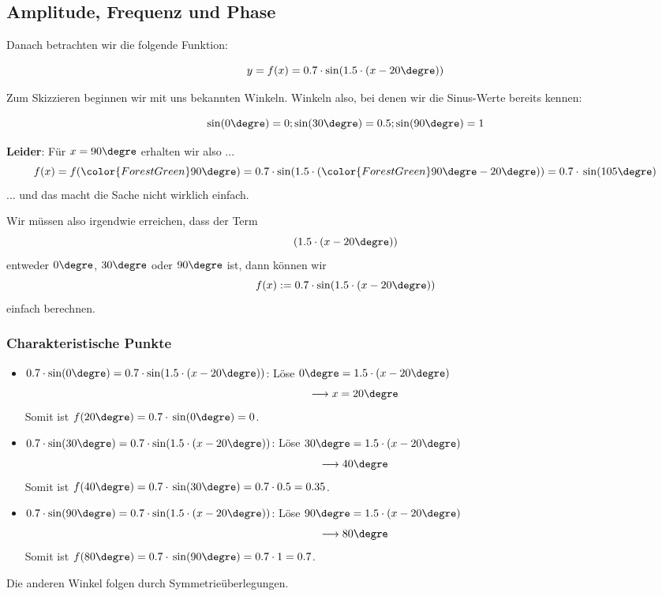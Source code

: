 \subsection{Amplitude, Frequenz und Phase}


Danach betrachten wir die folgende Funktion:

$$y = f(x) = 0.7 \cdot \sin(1.5\cdot(x - 20\degre))$$

\renewcommand{\bbwFunctionColour}{gray!30}\noTRAINER{\trigsysDsin{}}
\renewcommand{\bbwFunctionColour}{blue}

Zum Skizzieren beginnen wir mit uns bekannten Winkeln. Winkeln also, bei denen wir die Sinus-Werte bereits kennen:

$$\sin(0\degre)  = 0  ; \sin(30\degre) = 0.5; \sin(90\degre) = 1  $$

\textbf{Leider}: Für $x=90\degre$ \zB erhalten wir also ... $$f(x) = f({\color{ForestGreen}90\degre}) = 0.7\cdot\sin(1.5\cdot({\color{ForestGreen}90\degre}-20\degre)) = 0.7\cdot{}\sin(105\degre)$$ ... und das macht die Sache nicht wirklich einfach.


Wir müssen also irgendwie erreichen, dass der Term $$(1.5\cdot(x-20\degre))$$
entweder $0\degre$, $30\degre$ oder $90\degre$ ist, dann können
wir $$f(x) := 0.7\cdot\sin(1.5\cdot(x-20\degre))$$ einfach berechnen.


\newpage
\subsubsection{Charakteristische Punkte}

\begin{itemize}
\item  $0.7\cdot\sin(0\degre) = 0.7\cdot\sin(1.5\cdot(x-20\degre))$:
  Löse $0\degre = 1.5\cdot(x-20\degre)$
  $$\longrightarrow x=20\degre$$
  Somit ist $f(20\degre) = 0.7\cdot{}\sin(0\degre) = 0$.
\item  $0.7\cdot\sin(30\degre) = 0.7\cdot\sin(1.5\cdot(x-20\degre))$:
  Löse $30\degre = 1.5\cdot(x-20\degre)$
  $$\longrightarrow 40\degre$$
  Somit ist $f(40\degre) = 0.7\cdot{}\sin(30\degre) = 0.7\cdot{}0.5 = 0.35$.
\item  $0.7\cdot\sin(90\degre) = 0.7\cdot\sin(1.5\cdot(x-20\degre))$:
  Löse $90\degre = 1.5\cdot(x-20\degre)$
  $$\longrightarrow 80\degre$$
  Somit ist $f(80\degre) = 0.7\cdot{}\sin(90\degre) = 0.7\cdot{}1 = 0.7$.
\end{itemize}
Die anderen Winkel folgen durch Symmetrieüberlegungen.


